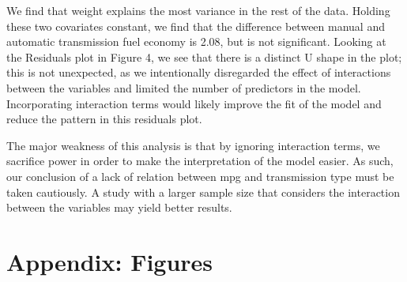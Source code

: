 \documentclass[]{article}
\begin{document}
We find that weight explains the most variance in the rest of the data.
Holding these two covariates constant, we find that the difference
between manual and automatic transmission fuel economy is 2.08, but is
not significant. Looking at the Residuals plot in Figure 4, we see that
there is a distinct U shape in the plot; this is not unexpected, as we
intentionally disregarded the effect of interactions between the
variables and limited the number of predictors in the model.
Incorporating interaction terms would likely improve the fit of the
model and reduce the pattern in this residuals plot.

The major weakness of this analysis is that by ignoring interaction
terms, we sacrifice power in order to make the interpretation of the
model easier. As such, our conclusion of a lack of relation between mpg
and transmission type must be taken cautiously. A study with a larger
sample size that considers the interaction between the variables may
yield better results.

\section{Appendix: Figures}\label{appendix-figures}
\end{document}
